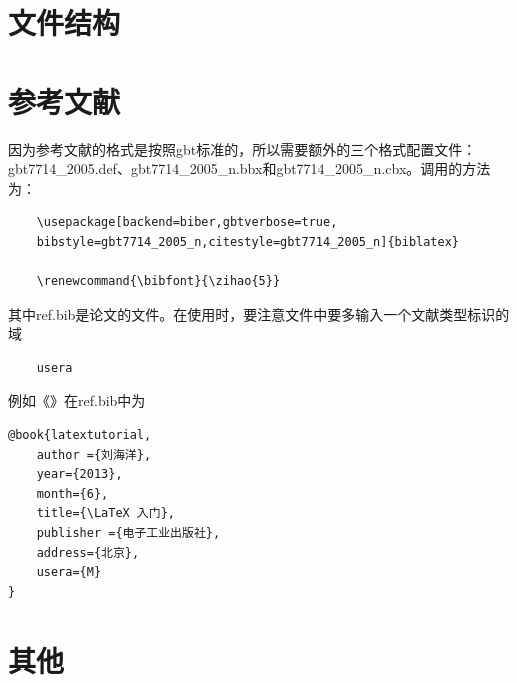 \documentclass{LZU}
\renewcommand{\bibfont}{\zihao{5}}
\newcommand{\filename}[1]{{\ttfamily #1}}
\begin{document}

\section{文件结构}
\section{参考文献}
因为参考文献的格式是按照gbt标准的，所以需要额外的三个格式配置文件：\filename{gbt7714\_2005.def}、\filename{gbt7714\_2005\_n.bbx}和\filename{gbt7714\_2005\_n.cbx}。调用的方法为：
\begin{verbatim}
    \usepackage[backend=biber,gbtverbose=true,
    bibstyle=gbt7714_2005_n,citestyle=gbt7714_2005_n]{biblatex}
    
    \renewcommand{\bibfont}{\zihao{5}}
\end{verbatim}
其中\filename{ref.bib}是论文的文件。在使用时，要注意文件中要多输入一个文献类型标识的域
\begin{verbatim}
    usera
\end{verbatim}
例如《》\cite{latextutorial}在\filename{ref.bib}中为
\begin{verbatim}
@book{latextutorial,
    author ={刘海洋},
    year={2013},
    month={6},
    title={\LaTeX 入门},
    publisher ={电子工业出版社},
    address={北京},
    usera={M}
}
\end{verbatim}
\section{其他}
\end{document}

